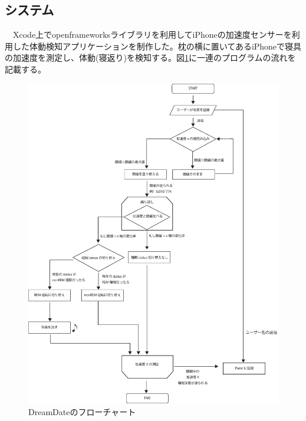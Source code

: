 \subsection{システム}
　Xcode上でopenframeworksライブラリを利用してiPhoneの加速度センサーを利用した体動検知アプリケーションを制作した。枕の横に置いてあるiPhoneで寝具の加速度を測定し、体動(寝返り)を検知する。図\ref{system}に一連のプログラムの流れを記載する。\\
\begin{figure}[htbp]
\begin{center}
\includegraphics[width=15cm]{eps/system.eps}
\caption{DreamDateのフローチャート}
\label{system}
\end{center}
\end{figure}
